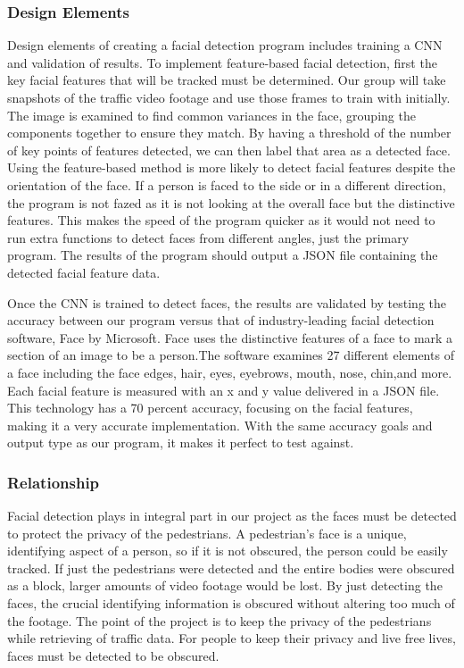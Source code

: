 \subsubsection{Design Elements}

Design elements of creating a facial detection program includes training a CNN and validation of results. To implement feature-based facial detection, first the key facial features that will be tracked must be determined. Our group will take snapshots of the traffic video footage and use those frames to train with initially. The image is examined to find common variances in the face, grouping the components together to ensure they match. By having a threshold of the number of key points of features detected, we can then label that area as a detected face. Using the feature-based method is more likely to detect facial features despite the orientation of the face. If a person is faced to the side or in a different direction, the program is not fazed as it is not looking at the overall face but the distinctive features. This makes the speed of the program quicker as it would not need to run extra functions to detect faces from different angles, just the primary program. The results of the program should output a JSON file containing the detected facial feature data.

Once the CNN is trained to detect faces, the results are validated by testing the accuracy between our program versus that of industry-leading facial detection software, Face by Microsoft. Face uses the distinctive features of a face to mark a section of an image to be a person.The software examines 27 different elements of a face including the face edges, hair, eyes, eyebrows, mouth, nose, chin,and more. Each facial feature is measured with an x and y value delivered in a JSON file. This technology has a 70 percent accuracy, focusing on the facial features, making it a very accurate implementation. With the same accuracy goals and output type as our program, it makes it perfect to test against. 

\subsubsection{Relationship}

Facial detection plays in integral part in our project as the faces must be detected to protect the privacy of the pedestrians. A pedestrian’s face is a unique, identifying aspect of a person, so if it is not obscured, the person could be easily tracked. If just the pedestrians were detected and the entire bodies were obscured as a block, larger amounts of video footage would be lost. By just detecting the faces, the crucial identifying information is obscured without altering too much of the footage. The point of the project is to keep the privacy of the pedestrians while retrieving of traffic data. For people to keep their privacy and live free lives, faces must be detected to be obscured.


